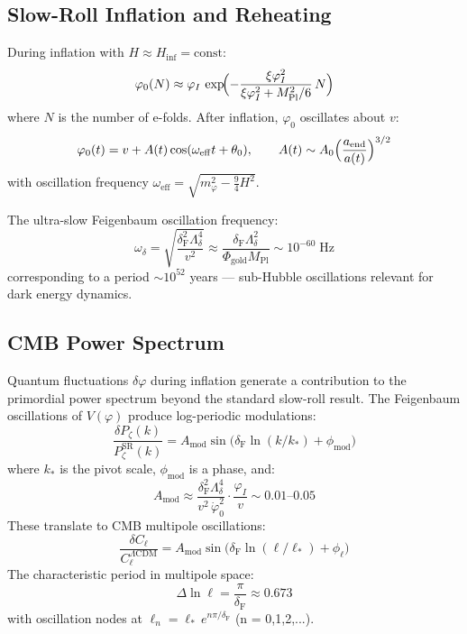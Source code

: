 \documentclass[12pt,a4paper]{article}
\newcommand{\MPl}{M_{\mathrm{Pl}}}
\newcommand{\Feig}{\delta_{\mathrm{F}}}
\numberwithin{equation}{section}
\begin{document}
\subsection{Slow-Roll Inflation and Reheating}

During inflation with $H \approx H_{\inf} = \text{const}$:
\begin{equation}
  \varphi_0(N) \approx \varphi_I\,\exp\!\Bigl(
  -\frac{\xi\varphi_I^2}{\xi\varphi_I^2 + \MPl^2/6}\,N\Bigr)
  \label{eq:phi_inflation}
\end{equation}
where $N$ is the number of e-folds. After inflation, $\varphi_0$ oscillates about $v$:
\begin{equation}
  \varphi_0(t) = v + A(t)\cos(\omega_{\mathrm{eff}} t + \theta_0),
  \qquad A(t) \sim A_0\Bigl(\frac{a_{\mathrm{end}}}{a(t)}\Bigr)^{3/2}
  \label{eq:phi_oscillation}
\end{equation}
with oscillation frequency $\omega_{\mathrm{eff}} = \sqrt{m_\varphi^2 - \tfrac{9}{4}H^2}$.

The ultra-slow Feigenbaum oscillation frequency:
\begin{equation}
  \omega_\delta = \sqrt{\frac{\Feig^2\Lambda_\delta^4}{v^2}}
  \approx \frac{\Feig\Lambda_\delta^2}{\Phi_{\mathrm{gold}}\MPl}
  \sim 10^{-60}\;\mathrm{Hz}
  \label{eq:omega_delta}
\end{equation}
corresponding to a period $\sim 10^{52}$ years --- sub-Hubble oscillations
relevant for dark energy dynamics.

\subsection{CMB Power Spectrum}
\label{subsec:cmb}

Quantum fluctuations $\delta\varphi$ during inflation generate a contribution to
the primordial power spectrum beyond the standard slow-roll result. The
Feigenbaum oscillations of $V(\varphi)$ produce log-periodic modulations:
\begin{equation}
  \frac{\delta P_\zeta(k)}{P_\zeta^{\mathrm{SR}}(k)}
  = A_{\mathrm{mod}}\sin\!\bigl(\Feig\ln(k/k_*) + \phi_{\mathrm{mod}}\bigr)
  \label{eq:cmb_power}
\end{equation}
where $k_*$ is the pivot scale, $\phi_{\mathrm{mod}}$ is a phase, and:
\begin{equation}
  A_{\mathrm{mod}} \approx \frac{\Feig^2\Lambda_\delta^4}{v^2\,\dot\varphi_0^2}\cdot\frac{\varphi_I}{v}
  \sim 0.01\text{--}0.05
  \label{eq:A_mod}
\end{equation}
These translate to CMB multipole oscillations:
\begin{equation}
  \frac{\delta C_\ell}{C_\ell^{\Lambda\mathrm{CDM}}}
  = A_{\mathrm{mod}}\sin\!\bigl(\Feig\ln(\ell/\ell_*) + \phi_\ell\bigr)
  \label{eq:cmb_ell}
\end{equation}
The characteristic period in multipole space:
\begin{equation}
  \Delta\ln\ell = \frac{\pi}{\Feig} \approx 0.673
  \label{eq:ell_period}
\end{equation}
with oscillation nodes at $\ell_n = \ell_*\,e^{n\pi/\Feig}$ (n = 0,1,2,...).
\end{document}

